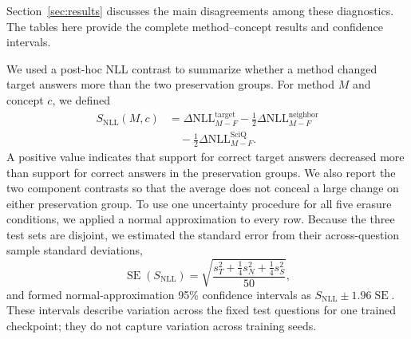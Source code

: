 Section~\ref{sec:results} discusses the main disagreements among these
diagnostics. The tables here provide the complete method--concept results and
confidence intervals.

We used a post-hoc NLL contrast to summarize whether a method changed target
answers more than the two preservation groups. For method $M$ and concept
$c$, we defined
\begin{equation}
\begin{split}
S_{\mathrm{NLL}}(M,c)
&=\Delta\mathrm{NLL}^{\mathrm{target}}_{M-F}
-\frac{1}{2}\Delta\mathrm{NLL}^{\mathrm{neighbor}}_{M-F} \\
&\quad-\frac{1}{2}\Delta\mathrm{NLL}^{\mathrm{SciQ}}_{M-F}.
\end{split}
\end{equation}
A positive value indicates that support for correct target answers decreased
more than support for correct answers in the preservation groups. We also
report the two component contrasts so that the average does not conceal a
large change on either preservation group. To use one uncertainty procedure
for all five erasure conditions, we applied a normal approximation to every
row. Because the three test sets are disjoint, we estimated the standard error
from their across-question sample standard deviations,
\begin{equation}
\operatorname{SE}(S_{\mathrm{NLL}})
=\sqrt{\frac{s_T^2+\tfrac{1}{4}s_N^2+\tfrac{1}{4}s_S^2}{50}},
\end{equation}
and formed normal-approximation 95\% confidence intervals as
$S_{\mathrm{NLL}}\pm1.96\operatorname{SE}$. These intervals describe
variation across the fixed test questions for one trained checkpoint; they do
not capture variation across training seeds.

